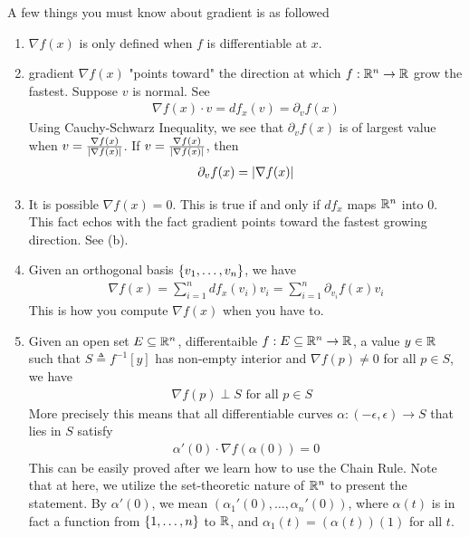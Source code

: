 \documentclass{report}
\begin{document}
\begin{mdframed}
A few things you must know about gradient is as followed
\begin{enumerate}[label=(\alph*)]
  \item $\nabla f(x)$ is only defined when $f$ is differentiable at  $x$.
  \item gradient $\nabla f(x)$ "points toward" the direction at which $f:\mathbb{R}^n\rightarrow \mathbb{R}$ grow the fastest. Suppose $v$ is normal. See 
\begin{align*}
\nabla f(x)\cdot v = df_x(v)=\partial_v f(x)
\end{align*}
Using Cauchy-Schwarz Inequality, we see that $\partial_v f(x)$ is of largest value when $v=\frac{\nabla f(x)}{\left|\nabla f(x)\right|}$. If $v=\frac{\nabla f(x)}{\left|\nabla f(x)\right|}$, then 
\begin{align*}
\partial_v f(x)=\left|\nabla f(x)\right|
\end{align*}
\item It is possible $\nabla f(x)=0$. This is true if and only if $df_x$ maps  $\mathbb{R}^n$ into $0$. This fact echos with the fact gradient points toward the fastest growing direction. See (b).  
\item Given an orthogonal basis $\{ v_1,\dots ,v_n \}$, we have
  \begin{align*}
  \nabla f(x)=\sum_{i=1}^n df_x (v_i)v_i=\sum_{i=1}^n \partial_{v_i}f(x)v_i
  \end{align*}
This is how you compute $\nabla f(x)$ when you have to.
\item Given an open set $E\subseteq \mathbb{R}^n$, differentaible $f:E\subseteq \mathbb{R}^n\rightarrow \mathbb{R}$, a value $y\in\mathbb{R}$ such that $S\triangleq f^{-1}[y]$ has non-empty interior and $\nabla f(p)\neq 0$ for all $p\in  S$, we have 
  \begin{align*}
 \nabla f(p)\perp S\text{ for all $p \in S$ } 
  \end{align*}
More precisely this means that all differentiable curves $\alpha:(-\epsilon  ,\epsilon )\rightarrow S$ that lies in $S$ satisfy 
 \begin{align*}
\alpha '(0)\cdot \nabla f(\alpha (0))=0
\end{align*}
This can be easily proved after we learn how to use the Chain Rule. Note that at here, we utilize the set-theoretic nature of $\mathbb{R}^n$ to present the statement. By $\alpha '(0)$, we mean $(\alpha_1'(0),\dots ,\alpha_n'(0))$, where $\alpha (t)$ is in fact a function from $\{ 1,\dots ,n \}$ to $\mathbb{R}$, and $\alpha_1(t)=(\alpha (t))(1)$ for all $t$.
\end{enumerate}
\end{mdframed}
\end{document}

